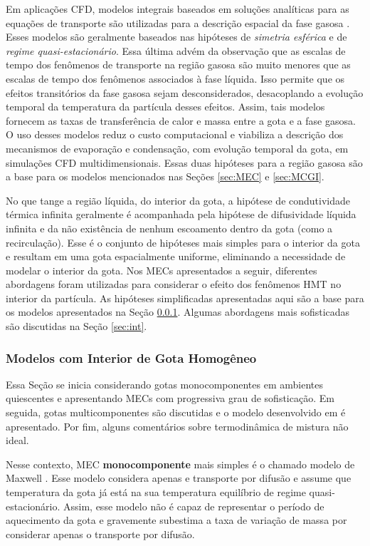 Em aplicações CFD, modelos integrais baseados em soluções analíticas para as equações de transporte são utilizadas para a descrição espacial da fase gasosa \cite{Sazhin2006}.
Esses modelos são geralmente baseados nas hipóteses de \emph{simetria esférica} e de \emph{regime quasi-estacionário}.
Essa última advém da observação que as escalas de tempo dos fenômenos de transporte na região gasosa são muito menores que as escalas de tempo dos fenômenos associados à fase líquida. Isso permite que os efeitos transitórios da fase gasosa sejam desconsiderados, desacoplando a evolução temporal da temperatura da partícula desses efeitos. 
Assim, tais modelos fornecem as taxas de transferência de calor e massa entre a gota e a fase gasosa.
O uso desses modelos reduz o custo computacional e viabiliza a descrição dos mecanismos de evaporação e condensação, com evolução temporal da gota, em simulações CFD multidimensionais.
Essas duas hipóteses para a região gasosa são a base para os modelos mencionados nas Seções \ref{sec:MEC} e \ref{sec:MCGI}.

No que tange a região líquida, do interior da gota, a hipótese de condutividade térmica infinita geralmente é acompanhada pela hipótese de difusividade líquida infinita e da não existência de nenhum escoamento dentro da gota (como a recirculação).
Esse é o conjunto de hipóteses mais simples para o interior da gota e resultam em uma gota espacialmente uniforme, eliminando a necessidade de modelar o interior da gota.
Nos MECs apresentados a seguir, diferentes abordagens foram utilizadas para considerar o efeito dos fenômenos HMT no interior da partícula.
As hipóteses simplificadas apresentadas aqui são a base para os modelos apresentados na Seção \ref{sec:RMM}.
Algumas abordagens mais sofisticadas são discutidas na Seção \ref{sec:int}.


\subsubsection{Modelos com Interior de Gota Homogêneo} \label{sec:RMM}

Essa Seção se inicia considerando gotas monocomponentes em ambientes quiescentes e apresentando MECs com progressiva grau de sofisticação.
Em seguida, gotas multicomponentes são discutidas e o modelo desenvolvido em \cite{SacomanoF2022IJHMT} é apresentado.
Por fim, alguns comentários sobre termodinâmica de mistura não ideal.

Nesse contexto, MEC \textbf{monocomponente} mais simples é o  chamado modelo de Maxwell \cite{Fuchs1959,Sazhin2006}.
Esse modelo considera apenas e transporte por difusão e assume que temperatura da gota já está na sua temperatura equilíbrio de regime quasi-estacionário.
Assim, esse modelo não é capaz de representar o período de aquecimento da gota e gravemente subestima a taxa de variação de massa por considerar apenas o transporte por difusão.

